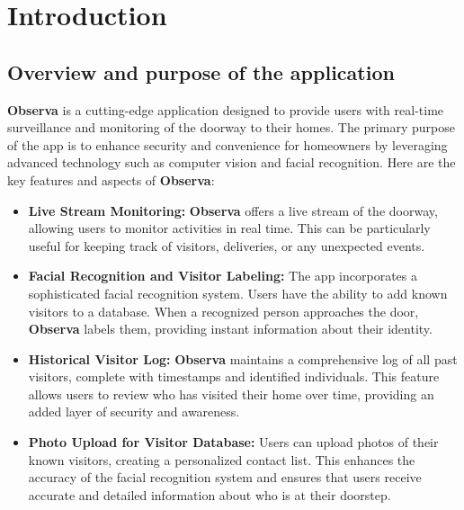 \documentclass[a4 paper, 12pt]{article}
\begin{document}
\section{Introduction}

\subsection{Overview and purpose of the application}
\textbf{Observa} is a cutting-edge application designed to provide users with real-time surveillance and monitoring of the doorway to their homes. The primary purpose of the app is to enhance security and convenience for homeowners by leveraging advanced technology such as computer vision and facial recognition. Here are the key features and aspects of \textbf{Observa}:

\begin{itemize}
    \item \textbf{Live Stream Monitoring:} \textbf{Observa} offers a live stream of the doorway, allowing users to monitor activities in real time. This can be particularly useful for keeping track of visitors, deliveries, or any unexpected events.
    
    \item \textbf{Facial Recognition and Visitor Labeling:} The app incorporates a sophisticated facial recognition system. Users have the ability to add known visitors to a database. When a recognized person approaches the door, \textbf{Observa} labels them, providing instant information about their identity.
    
    \item \textbf{Historical Visitor Log:} \textbf{Observa} maintains a comprehensive log of all past visitors, complete with timestamps and identified individuals. This feature allows users to review who has visited their home over time, providing an added layer of security and awareness.
    
    \item \textbf{Photo Upload for Visitor Database:} Users can upload photos of their known visitors, creating a personalized contact list. This enhances the accuracy of the facial recognition system and ensures that users receive accurate and detailed information about who is at their doorstep.
\end{itemize}
\end{document}
